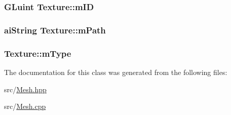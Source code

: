 \subsubsection[{\texorpdfstring{m\+ID}{mID}}]{\setlength{\rightskip}{0pt plus 5cm}G\+Luint Texture\+::m\+ID}\hypertarget{classTexture_ad34618c2c7f986a956453d1208a1912b}{}\label{classTexture_ad34618c2c7f986a956453d1208a1912b}
\subsubsection[{\texorpdfstring{m\+Path}{mPath}}]{\setlength{\rightskip}{0pt plus 5cm}ai\+String Texture\+::m\+Path}\hypertarget{classTexture_a637c7fd5c6fab7b1b2cbc91d8b5a9bba}{}\label{classTexture_a637c7fd5c6fab7b1b2cbc91d8b5a9bba}
\subsubsection[{\texorpdfstring{m\+Type}{mType}}]{ Texture\+::m\+Type}\hypertarget{classTexture_a25fca6d1c32a423f83decd7f738864ce}{}\label{classTexture_a25fca6d1c32a423f83decd7f738864ce}


The documentation for this class was generated from the following files\+:\begin{DoxyCompactItemize}
\item 
src/\hyperlink{Mesh_8hpp}{Mesh.\+hpp}\item 
src/\hyperlink{Mesh_8cpp}{Mesh.\+cpp}\end{DoxyCompactItemize}
